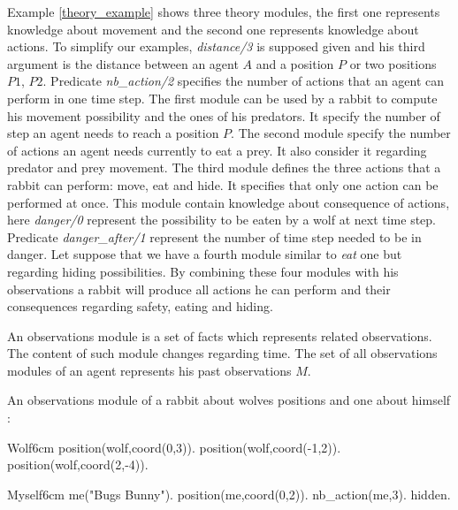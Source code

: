 \documentclass{aamas2012}
\begin{document}
\begin{example}
	\end{example}
	
	Example \ref{theory_example} shows three theory modules, the first one represents knowledge about movement and the second one represents knowledge about actions.
	To simplify our examples, \emph{distance/3} is supposed given and his third argument is the distance between an agent $A$ and a position $P$ or two positions $P1$, $P2$.
	Predicate \emph{nb\_action/2} specifies the number of actions that an agent can perform in one time step.
	The first module can be used by a rabbit to compute his movement possibility and the ones of his predators.
	It specify the number of step an agent needs to reach a position $P$.
	The second module specify the number of actions an agent needs currently to eat a prey.
	It also consider it regarding predator and prey movement.
	The third module defines the three actions that a rabbit can perform: move, eat and hide.
	It specifies that only one action can be performed at once.
	This module contain knowledge about consequence of actions, here \emph{danger/0} represent the possibility to be eaten by a wolf at next time step.
	Predicate \emph{danger\_after/1} represent the number of time step needed to be in danger.
	Let suppose that we have a fourth module similar to \emph{eat} one but regarding hiding possibilities.
	By combining these four modules with his observations a rabbit will produce all actions he can perform and their consequences regarding safety, eating and hiding.

	\begin{definition}
		An observations module is a set of facts which represents related observations.
		The content of such module changes regarding time.
		The set of all observations modules of an agent represents his past observations $M$.
	\end{definition}
	
	\begin{example}
		\label{observations_example}
		An observations module of a rabbit about wolves positions and one about himself :\newline
		\begin{module}{Wolf}{6cm}
			position(wolf,coord(0,3)).\newline
			position(wolf,coord(-1,2)).\newline
			position(wolf,coord(2,-4)).
		\end{module}
		
		\begin{module}{Myself}{6cm}
			me("Bugs Bunny").\newline
			position(me,coord(0,2)).\newline
			nb\_action(me,3).
			hidden.
		\end{module}
	\end{example}
\end{document}
